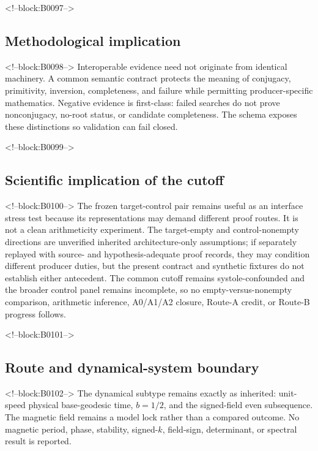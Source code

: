 \documentclass[11pt,a4paper]{article}
\begin{document}
<!--block:B0097-->
\hypertarget{methodological-implication}{%
\subsection{Methodological implication}\label{methodological-implication}}

<!--block:B0098-->
Interoperable evidence need not originate from identical machinery. A common semantic contract protects the meaning of conjugacy, primitivity, inversion, completeness, and failure while permitting producer-specific mathematics. Negative evidence is first-class: failed searches do not prove nonconjugacy, no-root status, or candidate completeness. The schema exposes these distinctions so validation can fail closed.

<!--block:B0099-->
\hypertarget{scientific-implication-of-the-cutoff}{%
\subsection{Scientific implication of the cutoff}\label{scientific-implication-of-the-cutoff}}

<!--block:B0100-->
The frozen target-control pair remains useful as an interface stress test because its representations may demand different proof routes. It is not a clean arithmeticity experiment. The target-empty and control-nonempty directions are unverified inherited architecture-only assumptions; if separately replayed with source- and hypothesis-adequate proof records, they may condition different producer duties, but the present contract and synthetic fixtures do not establish either antecedent. The common cutoff remains systole-confounded and the broader control panel remains incomplete, so no empty-versus-nonempty comparison, arithmetic inference, A0/A1/A2 closure, Route-A credit, or Route-B progress follows.

<!--block:B0101-->
\hypertarget{route-and-dynamical-system-boundary}{%
\subsection{Route and dynamical-system boundary}\label{route-and-dynamical-system-boundary}}

<!--block:B0102-->
The dynamical subtype remains exactly as inherited: unit-speed physical base-geodesic time, \(b=1/2\), and the signed-field even subsequence. The magnetic field remains a model lock rather than a compared outcome. No magnetic period, phase, stability, signed-\(k\), field-sign, determinant, or spectral result is reported.
\end{document}
